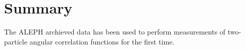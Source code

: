 \section{Summary}

The ALEPH archieved data has been used to perform measurements of two-particle angular correlation functions for the first time. 
